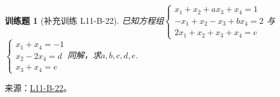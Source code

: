 \documentclass[12pt,fontset=fandol]{ctexart}
\newtheorem{exercise}{训练题}[section]
\begin{document}
\begin{exercise}[补充训练 L11-B-22]\label{prob:L11-B-22}
已知方程组$\begin{cases}
                x_1+x_2+ax_3+x_4=1 \\ -x_1+x_2-x_3+bx_4=2 \\ 2x_1+x_2+x_3+x_4=c
            \end{cases}$与$\begin{cases}
                x_1+x_4=-1 \\ x_2-2x_4=d \\ x_3+x_4=e
            \end{cases}$同解，求$a,b,c,d,e$.
\end{exercise}
\noindent 来源：\href{https://github.com/yhwu-is/Linear-Algebra-Left-Undone/blob/new/%E8%AE%B2%E4%B9%89/%E4%B8%93%E9%A2%98/11%20%E6%9C%9D%E8%8A%B1%E5%A4%95%E6%8B%BE.tex}{L11-B-22}。
\end{document}
